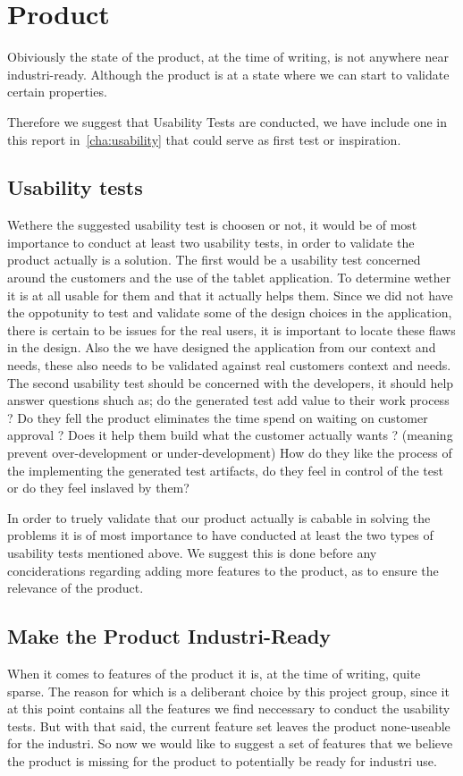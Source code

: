 \section{Product}
Obiviously the state of the product, at the time of writing, is not anywhere near industri-ready.
Although the product is at a state where we can start to validate certain properties.

Therefore we suggest that Usability Tests are conducted, we have include one in this report in~\autoref{cha:usability} that could serve as first test or inspiration.

\subsection{Usability tests}
Wethere the suggested usability test is choosen or not, it would be of most importance to conduct at least two usability tests, in order to validate the product actually is a solution.
The first would be a usability test concerned around the customers and the use of the tablet application.
To determine wether it is at all usable for them and that it actually helps them.
Since we did not have the oppotunity to test and validate some of the design choices in the application, there is certain to be issues for the real users, it is important to locate these flaws in the design.
Also the we have designed the application from our context and needs, these also needs to be validated against real customers context and needs.
The second usability test should be concerned with the developers, it should help answer questions shuch as; do the generated test add value to their work process ? 
Do they fell the product eliminates the time spend on waiting on customer approval ?
Does it help them build what the customer actually wants ? (meaning prevent over-development or under-development)
How do they like the process of the implementing the generated test artifacts, do they feel in control of the test or do they feel inslaved by them?

In order to truely validate that our product actually is cabable in solving the problems it is of most importance to have conducted at least the two types of usability tests mentioned above.
We suggest this is done before any conciderations regarding adding more features to the product, as to ensure the relevance of the product.

\subsection{Make the Product Industri-Ready}
When it comes to features of the product it is, at the time of writing, quite sparse.
The reason for which is a deliberant choice by this project group, since it at this point contains all the features we find neccessary to conduct the usability tests.
But with that said, the current feature set leaves the product none-useable for the industri.
So now we would like to suggest a set of features that we believe the product is missing for the product to potentially be ready for industri use.


